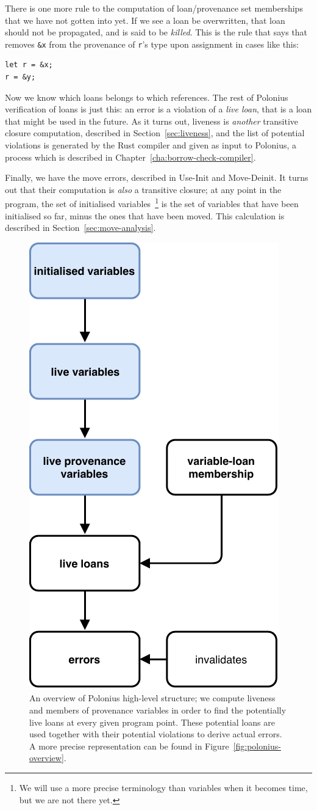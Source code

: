 \documentclass[11pt,a4paper,twoside,openany]{report}
\newcommand{\InRust}[1]{\texttt{#1}}
\renewcommand\_{\textunderscore\allowbreak}
\begin{document}
There is one more rule to the computation of loan/provenance set memberships
that we have not gotten into yet. If we see a loan be overwritten, that
loan should not be propagated, and is said to be \textit{killed}. This is the
rule that says that removes \InRust{&x} from the provenance of \InRust{r}'s type
upon assignment in cases like this:
\begin{verbatim}
let r = &x;
r = &y;
\end{verbatim}

Now we know which loans belongs to which references. The rest of Polonius
verification of loans is just this: an error is a violation of a \textit{live
  loan}, that is a loan that might be used in the future. As it turns out,
liveness is \textit{another} transitive closure computation, described in
Section~\ref{sec:liveness}, and the list of potential violations is generated by
the Rust compiler and given as input to Polonius, a process which is described
in Chapter~\ref{cha:borrow-check-compiler}.

Finally, we have the move errors, described in Use-Init and Move-Deinit. It
turns out that their computation is \textit{also} a transitive closure; at any
point in the program, the set of initialised variables~\footnote{We will use a
  more precise terminology than variables when it becomes time, but we are not
  there yet.} is the set of variables that have been initialised so far, minus
the ones that have been moved. This calculation is described in
Section~\ref{sec:move-analysis}.

\begin{figure}[h!]
  \centering
  \includegraphics[width=0.4\linewidth]{Graphs/polonius-high-level-overview}
  \caption[Polonius High-Level Overview]{An overview of Polonius high-level
    structure; we compute liveness and members of provenance variables in order
    to find the potentially live loans at every given program point. These
    potential loans are used together with their potential violations to derive
    actual errors. A more precise representation can be found in
    Figure~\ref{fig:polonius-overview}.}\label{fig:polonius-high-level-overview}
\end{figure}
\end{document}
